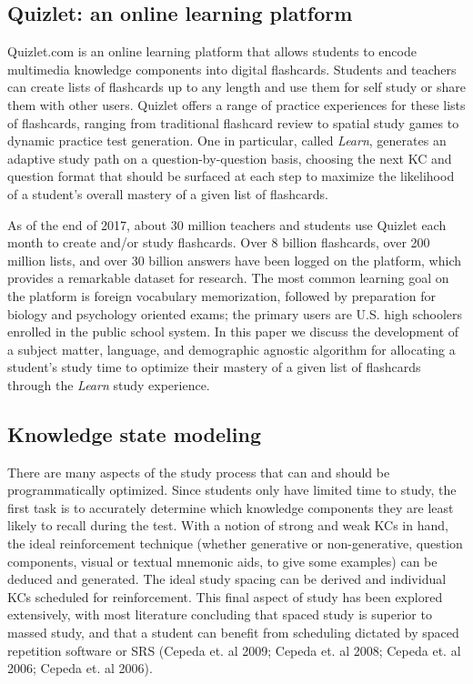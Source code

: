 \documentclass[a4paper,12pt]{article}
\begin{document}
\subsection{Quizlet: an online learning platform}
Quizlet.com is an online learning platform that allows students to encode multimedia knowledge components into digital flashcards. Students and teachers can create lists of flashcards up to any length and use them for self study or share them with other users. Quizlet offers a range of practice experiences for these lists of flashcards, ranging from traditional flashcard review to spatial study games to dynamic practice test generation. One in particular, called \textit{Learn}, generates an adaptive study path on a question-by-question basis, choosing the next KC and question format that should be surfaced at each step to maximize the likelihood of a student's overall mastery of a given list of flashcards. 

As of the end of 2017, about 30 million teachers and students use Quizlet each month to create and/or study flashcards. Over 8 billion flashcards, over 200 million lists, and over 30 billion answers have been logged on the platform, which provides a remarkable dataset for research. The most common learning goal on the platform is foreign vocabulary memorization, followed by preparation for biology and psychology oriented exams; the primary users are U.S. high schoolers enrolled in the public school system. In this paper we discuss the development of a subject matter, language, and demographic agnostic algorithm for allocating a student's study time to optimize their mastery of a given list of flashcards through the \textit{Learn} study experience.

\subsection{Knowledge state modeling}
There are many aspects of the study process that can and should be programmatically optimized. Since students only have limited time to study, the first task is to accurately determine which knowledge components they are least likely to recall during the test. With a notion of strong and weak KCs in hand, the ideal reinforcement technique (whether generative or non-generative, question components, visual or textual mnemonic aids, to give some examples) can be deduced and generated. The ideal study spacing can be derived and individual KCs scheduled for reinforcement. This final aspect of study has been explored extensively, with most literature concluding that spaced study is superior to massed study, and that a student can benefit from scheduling dictated by spaced repetition software or SRS (Cepeda et. al 2009; Cepeda et. al 2008; Cepeda et. al 2006; Cepeda et. al 2006).
\end{document}
